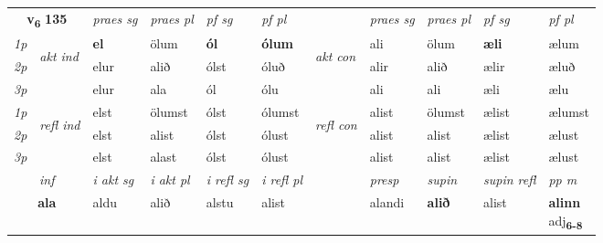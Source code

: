 \noindent
\begin{tabular}{lllllllllll} \toprule
\multicolumn{2}{c}{\textbf{v{\textsubscript{6}}} \Large{\textbf{135}}}  &  \textit{praes sg}  & \textit{praes pl}  &\textit{ pf sg} & \textit{pf pl} &  &  \textit{praes sg}  & \textit{praes pl}  & \textit{pf sg} & \textit{pf pl } \\*
	\cmidrule{3-6} \cmidrule{8-11}
 {\textit{1p}} & \multirow{3}{*}{\begin{turn}{90}\textit{akt ind}\end{turn}} & \textbf{el} & ölum & \textbf{ól} & \textbf{ólum} & \multirow{3}{*}{\begin{turn}{90}\textit{akt con}\end{turn}} &ali & ölum & \textbf{æli} & ælum\\*
 {\textit{2p}} &  &  elur  & alið & ólst & óluð & & alir & alið & ælir & æluð \\*
{\textit{3p}} &  & elur & ala & ól & ólu & & ali & ali& æli & ælu \\*
\cmidrule{3-6} \cmidrule{8-11}
 {\textit{1p}} & \multirow{3}{*}{\begin{turn}{90}\textit{refl ind}\end{turn}}  & elst & ölumst & ólst & ólumst & \multirow{3}{*}{\begin{turn}{90}\textit{refl con}\end{turn}}  &alist & ölumst & ælist & ælumst \\*
 {\textit{2p}} &  & elst & alist & ólst & ólust & &alist & alist & ælist & ælust \\*
 {\textit{3p}}  & & elst & alast & ólst & ólust & & alist & alist& ælist & ælust \\*
\cmidrule{3-6} \cmidrule{8-11}

   \multicolumn{2}{c}{\textit{inf}}  & \textit{i akt sg} & \textit{i akt pl} & \textit{i refl sg} & \textit{i refl pl} && \textit{presp} & \textit{supin} & \textit{supin refl} & \textit{pp m} \\*
  \multicolumn{2}{c}{\textbf{ala}} & aldu  & alið & alstu & alist && alandi &  \textbf{alið} & alist & \specialcell{\textbf{alinn} \\ adj\textbf{\textsubscript{6-8}}} \\*
\end{tabular}

